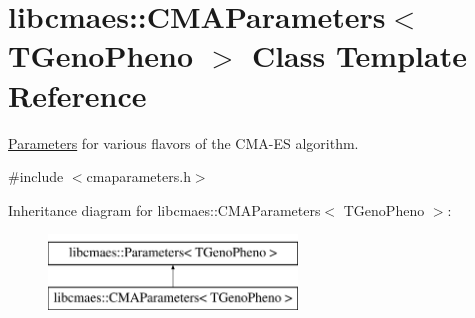\hypertarget{classlibcmaes_1_1CMAParameters}{\section{libcmaes\+:\+:C\+M\+A\+Parameters$<$ T\+Geno\+Pheno $>$ Class Template Reference}
\label{classlibcmaes_1_1CMAParameters}
}


\hyperlink{classlibcmaes_1_1Parameters}{Parameters} for various flavors of the C\+M\+A-\/\+E\+S algorithm.  




{\ttfamily \#include $<$cmaparameters.\+h$>$}

Inheritance diagram for libcmaes\+:\+:C\+M\+A\+Parameters$<$ T\+Geno\+Pheno $>$\+:\begin{figure}[H]
\begin{center}
\leavevmode
\includegraphics[height=2.000000cm]{classlibcmaes_1_1CMAParameters}
\end{center}
\end{figure}
